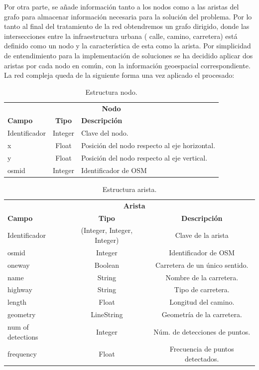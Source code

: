 Por otra parte, se añade información tanto a los nodos como a las aristas del grafo para 
almacenar información necesaria para la solución del problema. Por lo tanto al final del tratamiento 
de la red obtendremos un grafo dirigido, donde las intersecciones entre la infraestructura urbana (
calle, camino, carretera) está definido como un nodo y la característica de esta como la arista. Por 
simplicidad de entendimiento para la implementación de soluciones se ha decidido aplicar dos 
aristas por cada nodo en común, con la información geoespacial correspondiente. La red 
compleja queda de la siguiente forma una vez aplicado el procesado:
\begin{table}[h]
\centering
\begin{tabular}{l | c | l} 
\toprule
\multicolumn{3}{c}{\textbf{Nodo}} \\ 
\cmidrule(r){1-3}
{\textbf{Campo}} &  {\textbf{Tipo}} & {\textbf{Descripción}} \\
\cmidrule(r){1-3}
{Identificador}  & Integer  & Clave del nodo.\\
{x}  & Float & Posición del nodo respecto al eje horizontal. \\
{y}  & Float & Posición del nodo respecto al eje vertical.\\
{osmid} & Integer & Identificador de \ac{OSM} \\
\bottomrule
\end{tabular}
\caption{Estructura nodo.}
\label{TablaNodo}
\end{table}
\begin{table}[h]
\centering
\begin{tabular}{l | c | c } 
\toprule
\multicolumn{2}{r}{\textbf{Arista}} \\ 
\cmidrule(r){1-3}
{\textbf{Campo}} &  {\textbf{Tipo}} & {\textbf{Descripción}} \\
\cmidrule(r){1-3}
{Identificador}  & (Integer, Integer, Integer)  & {Clave de la arista}\\
{osmid}  & Integer  & Identificador de \ac{OSM} \\
{oneway} &  Boolean & Carretera de un único sentido. \\
{name} & String & Nombre de la carretera. \\
{highway} & String & Tipo de carretera. \\
{length} & Float & Longitud del camino. \\
{geometry} & LineString & Geometría de la carretera. \\
{num of detections} & Integer & Núm. de detecciones de puntos. \\
{frequency} & Float & Frecuencia de puntos detectados. \\
\bottomrule
\end{tabular}
\caption{Estructura arista.}
\label{TablaArista}
\end{table}
\newpage

